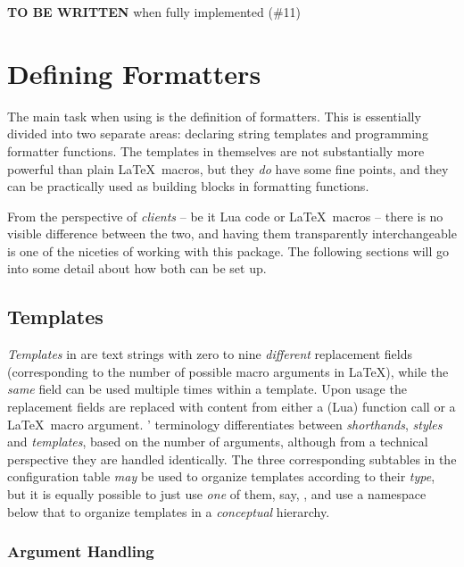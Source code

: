 \documentclass{scrartcl}
\begin{document}
\bigskip

\noindent
\textbf{TO BE WRITTEN} when fully implemented (\#11)



\section{Defining Formatters}
\label{sec:defining-formatters}

The main task when using  is the definition of formatters.
This is essentially divided into two separate areas: declaring string templates
and programming formatter functions.  The templates in themselves are not
substantially more powerful than plain \LaTeX\ macros, but they \emph{do} have
some fine points, and they can be practically used as building blocks in
formatting functions.

From the perspective of \emph{clients} -- be it Lua code or \LaTeX\ macros --
there is no visible difference between the two, and having them transparently
interchangeable is one of the niceties of working with this package.  The
following sections will go into some detail about how both can be set up.


\subsection{Templates}
\label{sec:templates}

\emph{Templates} in  are text strings with zero to nine
\emph{different} replacement fields (corresponding to the number of possible
macro arguments in \LaTeX), while the \emph{same} field can be used multiple
times within a template.  Upon usage the replacement fields are replaced with
content from either a (Lua) function call or a \LaTeX\ macro argument.
' terminology differentiates between \emph{shorthands},
\emph{styles} and \emph{templates}, based on the number of arguments, although
from a technical perspective they are handled identically. The three
corresponding subtables in the configuration table \emph{may} be used to
organize templates according to their \emph{type}, but it is equally possible to
just use \emph{one} of them, say, , and use a namespace below
that to organize templates in a \emph{conceptual} hierarchy.


\subsubsection{Argument Handling}
\label{sec:templates-argument-handling}
\end{document}
